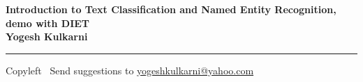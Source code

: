 
\graphicspath{{images/}}

\footnotesize


\begin{center}
\Large{\textbf{Introduction to Text Classification and Named Entity Recognition, demo with DIET\\ Yogesh Kulkarni}}  
\end{center}

\begin{multicols}{2}

\end{multicols}

\rule{\linewidth}{0.25pt}
\scriptsize
Copyleft \textcopyleft\  Send suggestions to 
\href{http://www.yogeshkulkarni.com}{yogeshkulkarni@yahoo.com}


